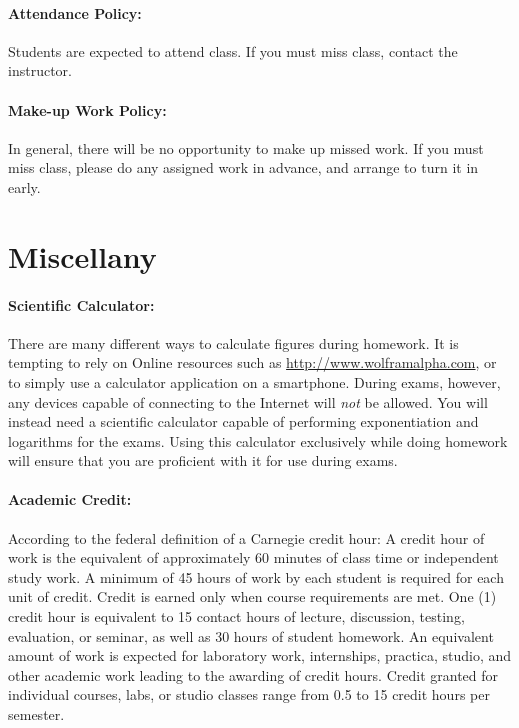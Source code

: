 \documentclass[12pt, letterpaper]{article}
\begin{document}
\paragraph{Attendance Policy:}
Students are expected to attend class. If you must miss class, contact the instructor.

\paragraph{Make-up Work Policy:}
In general, there will be no opportunity to make up missed work. If you must miss class, please do any assigned work in advance, and arrange to turn it in early.

\section*{Miscellany}

\paragraph{Scientific Calculator:}
There are many different ways to calculate figures during homework. It is tempting to rely on Online resources such as \href{http://www.wolframalpha.com}{http://www.wolframalpha.com}, or to simply use a calculator application on a smartphone. During exams, however, any devices capable of connecting to the Internet will \emph{not} be allowed. You will instead need a scientific calculator capable of performing exponentiation and logarithms for the exams. Using this calculator exclusively while doing homework will ensure that you are proficient with it for use during exams.

\paragraph{Academic Credit:}
According to the federal definition of a Carnegie credit hour: A credit hour of work is the equivalent of approximately 60 minutes of class time or independent study work. A minimum of 45 hours of work by each student is required for each unit of credit. Credit is earned only when course requirements are met. One (1) credit hour is equivalent to 15 contact hours of lecture, discussion, testing, evaluation, or seminar, as well as 30 hours of student homework. An equivalent amount of work is expected for laboratory work, internships, practica, studio, and other academic work leading to the awarding of credit hours. Credit granted for individual courses, labs, or studio classes range from 0.5 to 15 credit hours per semester.
\end{document}
